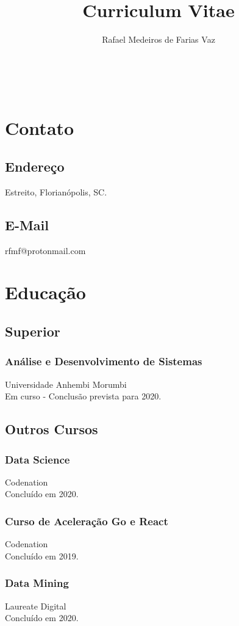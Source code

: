 \documentclass{article}
\renewcommand{\maketitle}{
\begin{center}
\begin{Huge}
\bfseries\theauthor \\
\end{Huge}
\end{center}
}
\begin{document}


\title{Curriculum Vitae}
\author{Rafael Medeiros de Farias Vaz}

\maketitle

\begin{multicols}{2}

\section{Contato}
  \subsection{Endere\c{c}o}
Estreito, Florianópolis, SC.
\subsection{E-Mail}
rfmf@protonmail.com

\section{Educa\c{c}\~ao}
\subsection{Superior}
\subsubsection{An\'alise e Desenvolvimento de Sistemas}
Universidade Anhembi Morumbi \\
Em curso - Conclus\~ao prevista para 2020.

\subsection{Outros Cursos}
\subsubsection{Data Science}
Codenation \\
Conclu\'ido em 2020.
\subsubsection{Curso de Acelera\c{c}\~ao Go e React}
Codenation \\
Conclu\'ido em 2019.
\subsubsection{Data Mining}
Laureate Digital \\
Conclu\'ido em 2020.

\end{multicols}
\end{document}
